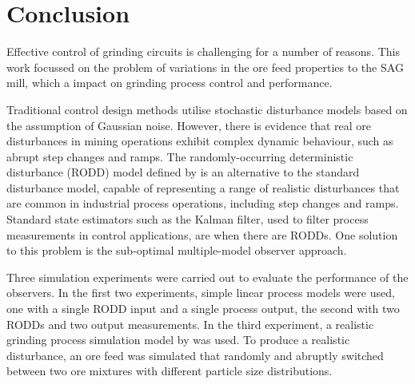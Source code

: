 \chapter*{Conclusion}           %
\label{chap-conclusion}         %

Effective control of grinding circuits is challenging for a number of reasons. This work focussed on the problem of variations in the ore feed properties to the \gls{SAG} mill, which  a  impact on grinding process control and performance. 

Traditional control design methods utilise stochastic disturbance models based on the assumption of Gaussian noise. However, there is evidence that real ore disturbances in mining operations exhibit complex dynamic behaviour, such as abrupt step changes and ramps.  The randomly-occurring deterministic disturbance (\gls{RODD}) model defined by \cite{macgregor_duality_1984} is an alternative to the standard disturbance model, capable of representing a range of realistic disturbances that are common in industrial process operations, including step changes and ramps. Standard state estimators such as the Kalman filter, used to filter process measurements in control applications, are  when there are \gls{RODD}s. One solution to this problem is the sub-optimal multiple-model observer approach. 

Three simulation experiments were carried out to evaluate the performance of the observers. In the first two experiments, simple linear process models were used, one with a single \gls{RODD} input and a single process output, the second with two \gls{RODD}s and two output measurements. In the third experiment, a realistic grinding process simulation model by \cite{perez_garcia_dynamic_2020} was used. To produce a realistic disturbance, an ore feed was simulated that randomly and abruptly switched between two ore mixtures with different particle size distributions.


